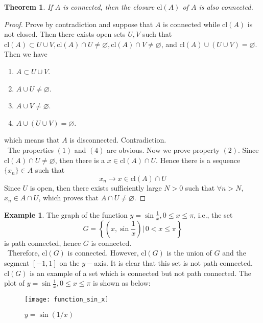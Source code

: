 \documentclass[12pt,leqno]{amsart}
\newtheorem{theorem}{Theorem}[section]
\theoremstyle{definition}
\newtheorem{example}{Example}[section]
\numberwithin{equation}{subsection}
\begin{document}
\medskip

\begin{theorem}
If $A$ is connected, then the closure $\text{cl}(A)$ of $A$ is also connected.
\end{theorem}
\begin{proof}
Prove by contradiction and suppose that $A$ is connected while $\text{cl}(A)$ is not closed. Then there exists open sets $U,V$ such that $\text{cl}(A)\subset U\cup V, \text{cl}(A)\cap U \neq\varnothing, \text{cl}(A)\cap V \neq\varnothing$, and $\text{cl}(A)\cup (U \cup V) = \varnothing$. Then we have 
\begin{enumerate}
    \item $A\subset U\cup V$.
    \item $A\cup U \neq\varnothing$.
    \item $A\cup V \neq\varnothing$.
    \item $A\cup (U \cup V) = \varnothing$.
\end{enumerate}
which means that $A$ is disconnected. Contradiction. \\
\hspace*{1em}\, The properties $(1)$ and $(4)$ are obvious. Now we prove property $(2)$. Since $\text{cl}(A)\cap U \neq\varnothing$, then there is a $x\in \text{cl}(A)\cap U$. Hence there is a sequence $\{x_n\}\in A$ such that $$x_n\to x\in \text{cl}(A)\cap U$$
Since $U$ is open, then there exists sufficiently large $N > 0$ such that $\forall n>N$, $x_n\in A\cap U$, which proves that $A\cap U\neq\varnothing$.
\end{proof}

\begin{example}
The graph of the function $y = \sin \frac{1}{x}, 0\leq x\leq \pi$, i.e., the set  $$G = \left\{(x, \sin \frac{1}{x})|\, 0< x\leq \pi\right\}$$
is path connected, hence $G$ is connected.\\
\hspace*{1em}\, Therefore, $\text{cl}(G)$ is connected. However, $\text{cl}(G)$ is the union of $G$ and the segment $[-1,1]$ on the $y-$axis. It is clear that this set is not path connected. $\text{cl}(G)$ is an example of a set which is connected but not path connected. The plot of $y = \sin \frac{1}{x}, 0\leq x\leq \pi$ is shown as below:
\begin{figure}[h]
    \centering
    \texttt{[image: function\_sin\_x]}
    \caption{$y = \sin(1/x)$}
    \label{fig:function_sin_x}
\end{figure}
\end{example}
\end{document}
